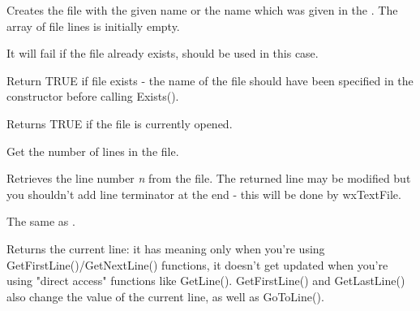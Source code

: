 \label{wxtextfilecreate}



Creates the file with the given name or the name which was given in the
. The array of file lines is initially
empty.

It will fail if the file already exists,  should
be used in this case.

\label{wxtextfileexists}


Return TRUE if file exists - the name of the file should have been specified
in the constructor before calling Exists().

\label{wxtextfileisopened}


Returns TRUE if the file is currently opened.

\label{wxtextfilegetlinecount}


Get the number of lines in the file.

\label{wxtextfilegetline}


Retrieves the line number {\it n} from the file. The returned line may be
modified but you shouldn't add line terminator at the end - this will be done
by wxTextFile.

\label{wxtextfileoperatorarray}


The same as .

\label{wxtextfilegetcurrentline}


Returns the current line: it has meaning only when you're using
GetFirstLine()/GetNextLine() functions, it doesn't get updated when
you're using "direct access" functions like GetLine(). GetFirstLine() and
GetLastLine() also change the value of the current line, as well as
GoToLine().

